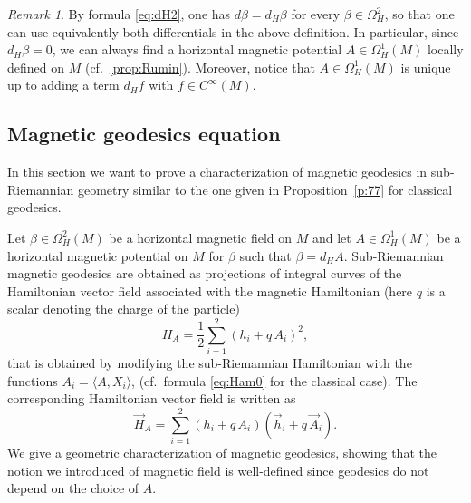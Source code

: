 \documentclass{amsart}
\theoremstyle{plain}
\theoremstyle{definition}
\theoremstyle{remark}
\newtheorem{remark}[thm]{Remark}
\newcommand{\diff}{d}%
\newcommand{\B}{\beta}
\begin{document}
\begin{remark} By formula \eqref{eq:dH2}, one has $\diff\B=\diff_{H}\B$ for every $\B\in\Omega^2_H$, so that one can use equivalently both differentials in the above definition. In particular, since $\diff_{H}\B=0$, we can always find a horizontal magnetic potential $A\in\Omega^1_H(M)$ locally defined on $M$ (cf.\  \cref{prop:Rumin}).  
 Moreover, notice that $A\in\Omega^1_H(M)$ is unique up to adding a term $\diff_Hf$ with $f\in C^\infty(M)$.
\end{remark}
\subsection{Magnetic geodesics equation}
In this section we want to prove a characterization of magnetic geodesics in sub-Riemannian geometry similar to the one given in Proposition~\ref{p:77} for classical geodesics.



Let $\B\in\Omega^2_H(M)$ be a horizontal magnetic field on $M$ and let $A\in\Omega^1_H(M)$ be a horizontal magnetic potential on $M$ for $\beta$ such that $\beta=\diff_{H}A$. Sub-Riemannian magnetic geodesics are obtained as projections of integral curves of the Hamiltonian vector field associated with the magnetic Hamiltonian (here $q$ is a scalar denoting the charge of the particle)
\begin{equation}\label{eq:accam}
H_{A}=\frac{1}{2}\sum_{i=1}^{2}(h_{i}+q\,A_{i})^{2},
\end{equation}
that is obtained by modifying the sub-Riemannian Hamiltonian with the functions $A_{i}=\langle A,X_{i} \rangle$,  (cf.\ formula \eqref{eq:Ham0} for the classical case). 
The corresponding Hamiltonian vector field is written as
$$\vec{H}_{A}=\sum_{i=1}^{2}(h_{i}+q\, A_{i})(\vec h_{i}+q\, \vec A_{i}).$$
We give a geometric characterization of magnetic geodesics, showing that the notion we introduced of magnetic field is well-defined since geodesics do not depend on the choice of $A$.
\end{document}
